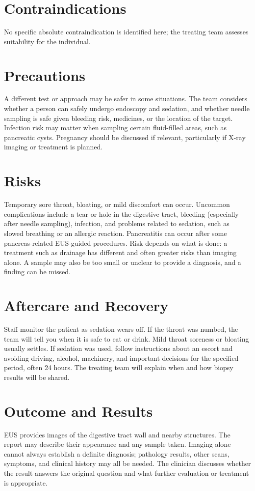 \section*{Contraindications}
No specific absolute contraindication is identified here; the treating team assesses suitability for the individual.

\section*{Precautions}
A different test or approach may be safer in some situations. The team considers whether a person can safely undergo endoscopy and sedation, and whether needle sampling is safe given bleeding risk, medicines, or the location of the target. Infection risk may matter when sampling certain fluid-filled areas, such as pancreatic cysts. Pregnancy should be discussed if relevant, particularly if X-ray imaging or treatment is planned.

\section*{Risks}
Temporary sore throat, bloating, or mild discomfort can occur. Uncommon complications include a tear or hole in the digestive tract, bleeding (especially after needle sampling), infection, and problems related to sedation, such as slowed breathing or an allergic reaction. Pancreatitis can occur after some pancreas-related EUS-guided procedures. Risk depends on what is done: a treatment such as drainage has different and often greater risks than imaging alone. A sample may also be too small or unclear to provide a diagnosis, and a finding can be missed.

\section*{Aftercare and Recovery}
Staff monitor the patient as sedation wears off. If the throat was numbed, the team will tell you when it is safe to eat or drink. Mild throat soreness or bloating usually settles. If sedation was used, follow instructions about an escort and avoiding driving, alcohol, machinery, and important decisions for the specified period, often 24 hours. The treating team will explain when and how biopsy results will be shared.

\section*{Outcome and Results}
EUS provides images of the digestive tract wall and nearby structures. The report may describe their appearance and any sample taken. Imaging alone cannot always establish a definite diagnosis; pathology results, other scans, symptoms, and clinical history may all be needed. The clinician discusses whether the result answers the original question and what further evaluation or treatment is appropriate.

